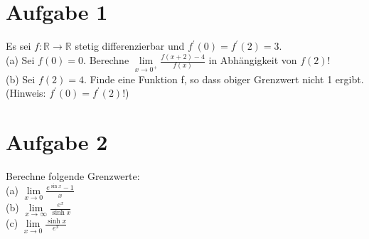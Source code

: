 \documentclass{scrartcl}
\begin{document}
\section*{Aufgabe 1}
Es sei $f:\mathbb{R}\rightarrow\mathbb{R}$ stetig differenzierbar und $f^\prime(0)=f^\prime(2)=3$.\\
(a) Sei $f(0)=0$. Berechne $\lim\limits_{x\rightarrow0^+}\frac{f(x+2)-4}{f(x)}$ in Abh\"angigkeit von $f(2)$!\\
(b) Sei $f(2)=4$. Finde eine Funktion f, so dass obiger Grenzwert nicht 1 ergibt. (Hinweis: $f^\prime(0)=f^\prime(2)$!)


\section*{Aufgabe 2}
Berechne folgende Grenzwerte:\\[0.5em]
(a) $\lim\limits_{x\rightarrow0}\frac{e^{\sin x}-1}{x}$\\[0.5em]
(b) $\lim\limits_{x\rightarrow\infty}\frac{e^x}{\sinh x}$\\[0.5em]
(c) $\lim\limits_{x\rightarrow0}\frac{\sinh x}{e^x}$
\end{document}
